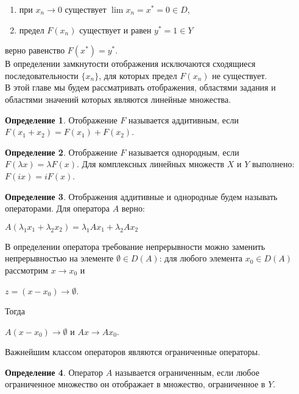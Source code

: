 \documentclass[12pt,a4paper,titlepage, oneside]{book}
\theoremstyle{definition}
\newtheorem*{definition}{Определение}
\theoremstyle{plain}
\theoremstyle{remark}
\theoremstyle{remark}
\theoremstyle{remark}
\theoremstyle{plain}
\theoremstyle{plain}
\begin{document}
\begin{enumerate}

 \item при $x_n \to 0$ существует $\lim x_n= x^*=0 \in D$,
 
 \item предел $F(x_n)$ существует и равен $y^*=1 \in Y$
 
\end{enumerate}
верно равенство $F(x^*)=y^*$.\\

В определении замкнутости отображения исключаются сходящиеся последовательности $\lbrace x_n \rbrace$, для которых предел $F(x_n)$ не существует.\\

В этой главе мы будем рассматривать отображения, областями задания и областями значений которых являются линейные множества.

\begin{definition} Отображение $F$ называется аддитивным, если $F(x_1+x_2)=F(x_1)+F(x_2)$.
\end{definition}

\begin{definition} Отображение $F$ называется однородным, если $F(\lambda x)=\lambda F(x)$. Для комплексных линейных множеств $X$ и $Y$ выполнено: $F(ix)=iF(x)$.
\end{definition}

\begin{definition} Отображения аддитивные и однородные будем называть операторами. Для оператора $A$ верно:
\begin{center}

	$A(\lambda_1x_1+\lambda_2x_2)=\lambda_1Ax_1+\lambda_2Ax_2$
	
\end{center}
\end{definition}

В определении оператора требование непрерывности можно заменить непрерывностью на элементе $\emptyset \in D(A)$: для любого элемента $x_0\in D(A)$ рассмотрим $x \to x_0$ и 
\begin{center}
$z=(x-x_0)\to \emptyset$.
\end{center}
Тогда 
\begin{center}
$A(x-x_0)\to \emptyset$ и $Ax \to Ax_0$.
\end{center}
 
Важнейшим классом операторов являются ограниченные операторы.

\begin{definition} Оператор $A$ называется ограниченным, если любое ограниченное множество он отображает в множество, ограниченное в $Y$.
\end{definition}
\end{document}
